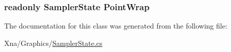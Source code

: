 \subsubsection[{Point\+Wrap}]{\setlength{\rightskip}{0pt plus 5cm}readonly {\bf Sampler\+State} Point\+Wrap\hspace{0.3cm}{\ttfamily [static]}}\label{classMicrosoft_1_1Xna_1_1Framework_1_1Graphics_1_1SamplerState_a2c02632e089d295d8f1cb5d6448c9353}


The documentation for this class was generated from the following file\+:\begin{DoxyCompactItemize}
\item 
Xna/\+Graphics/\hyperlink{SamplerState_8cs}{Sampler\+State.\+cs}\end{DoxyCompactItemize}
